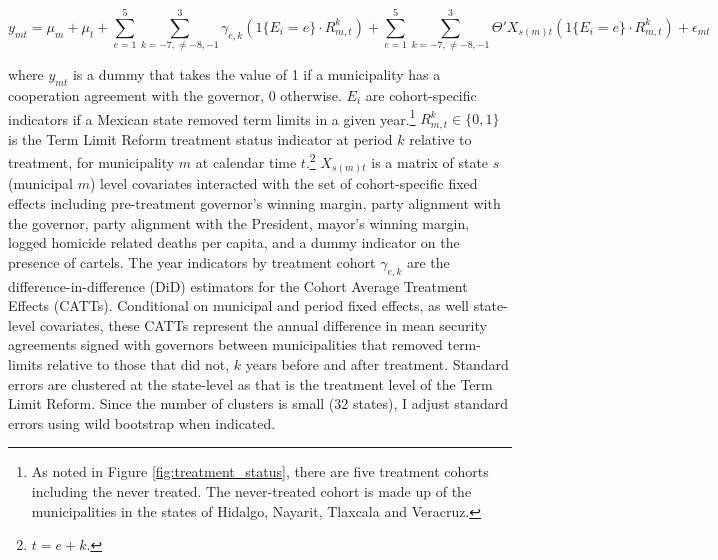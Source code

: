 \documentclass[12pt]{amsart}
\numberwithin{equation}{section}
\theoremstyle{definition}
\theoremstyle{definition}
\theoremstyle{definition}
\begin{document}
 
 \begin{equation}
\label{eq:abraham} 
y_{mt}=\mu_m + \mu_t + \sum^{5}_{e=1} \sum^3_{k=-7, \neq {-8,-1}} \gamma_{e,k}(1\{E_i=e\} \cdot R^k_{m,t}) + \sum^{5}_{e=1} \sum^3_{k=-7, \neq {-8,-1}}  \Theta'X_{s(m)t} (1\{E_i=e\} \cdot R^k_{m,t}) + \epsilon_{mt}
\end{equation} 
  
where $y_{mt}$ is a dummy that takes the value of 1 if a municipality has a cooperation agreement with the governor, 0 otherwise. $E_i$ are cohort-specific indicators if a Mexican state removed term limits in a given year.\footnote{As noted in Figure \ref{fig:treatment_status}, there are five treatment cohorts including the never treated. The never-treated cohort is made up of the municipalities in the states of Hidalgo, Nayarit, Tlaxcala and Veracruz.} $R^k_{m,t}\in \{0,1\}$  is the Term Limit Reform treatment status indicator at period $k$ relative to treatment, for municipality $m$ at calendar time $t$.\footnote{$t=e+k$.} $X_{s(m)t}$ is a matrix of state $s$ (municipal $m$) level covariates interacted with the set of cohort-specific fixed effects including pre-treatment governor's winning margin, party alignment with the governor, party alignment with the President, mayor's winning margin, logged homicide related deaths per capita, and a dummy indicator on the presence of cartels.  The year indicators by treatment cohort  $\gamma_{e,k}$ are the difference-in-difference (DiD) estimators for the Cohort Average Treatment Effects (CATTs). Conditional on municipal and period fixed effects, as well state-level covariates, these CATTs represent the annual difference in mean security agreements signed with governors between municipalities that removed term-limits relative to those that did not, $k$ years before and after treatment. Standard errors are clustered at the state-level as that is the treatment level of the Term Limit Reform. Since the number of clusters is small (32 states), I adjust standard errors using wild bootstrap when indicated. 
\end{document}
